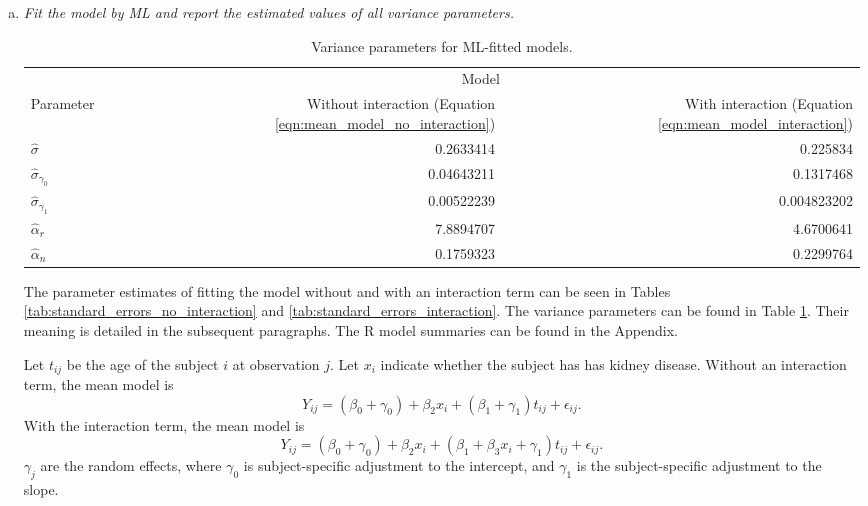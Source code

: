 \documentclass[11pt, letterpaper]{article}
\begin{document}
\begin{enumerate}[(a)]
\item {\em Fit the model by ML and
report the
estimated values of all variance parameters. }

\begin{table}
  \centering
  \begin{tabular}{lrr}
    \toprule
    & \multicolumn{2}{c}{Model} \\
    Parameter & Without interaction (Equation \ref{eqn:mean_model_no_interaction}) & With interaction (Equation \ref{eqn:mean_model_interaction}) \\
    \midrule
    $\hat{\sigma}$ & 0.2633414 & 0.225834 \\
    $\hat{\sigma}_{\gamma_0}$ & 0.04643211 & 0.1317468 \\
    $\hat{\sigma}_{\gamma_1}$ & 0.00522239 & 0.004823202 \\
    $\hat{\alpha}_r$ & 7.8894707 & 4.6700641 \\
    $\hat{\alpha}_n$ & 0.1759323  & 0.2299764 \\
    \bottomrule
  \end{tabular}
  \caption{Variance parameters for ML-fitted models.}
  \label{tab:variance_parameters}
\end{table}

\begin{description}
  The parameter estimates of fitting the model without and with an interaction
  term can be seen in Tables \ref{tab:standard_errors_no_interaction} and
  \ref{tab:standard_errors_interaction}. The variance parameters can be found in
  Table \ref{tab:variance_parameters}. Their meaning is detailed in the
  subsequent paragraphs. The \textsf{R} model summaries can be found in the
  Appendix.

  Let $t_{ij}$ be the age of the subject $i$ at observation $j$. Let $x_i$
  indicate whether the subject has has kidney disease. Without an interaction
  term, the mean model is
  \begin{equation}
    Y_{ij} = \left(\beta_0 + \gamma_0\right) +
    \beta_2x_i +
    \left(\beta_1 + \gamma_1\right)t_{ij} + \epsilon_{ij}.
    \label{eqn:mean_model_no_interaction}
  \end{equation}
  With the interaction term, the mean model is
  \begin{equation}
    Y_{ij} = \left(\beta_0 + \gamma_0\right) +
    \beta_2x_i +
    \left(\beta_1 + \beta_3x_i +\gamma_1\right)t_{ij} + \epsilon_{ij}.
    \label{eqn:mean_model_interaction}
  \end{equation}
  $\gamma_j$ are the random effects, where $\gamma_0$ is subject-specific
  adjustment to the intercept, and $\gamma_1$ is the subject-specific adjustment
  to the slope.
  

\end{description}
\end{enumerate}
\end{document}
